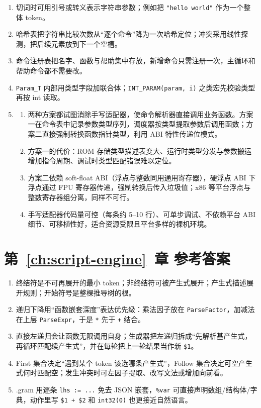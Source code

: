 \begin{enumerate}
	\item 切词时可用引号或转义表示字符串参数；例如把 \texttt{"hello world"} 作为一个整体 token。
	\item 哈希表把字符串比较次数从“逐个命令”降为一次哈希定位；冲突采用线性探测，把后续元素放到下一个空槽。
	\item 命令注册表把名字、函数与帮助集中存放，新增命令只需注册一次，主循环和帮助命令都不需要改。
	\item \texttt{Param\_T} 内部用类型字段加联合体；\texttt{INT\_PARAM(param, i)} 之类宏先校验类型再按 int 读取。
	\item
	\begin{enumerate}
		\item 两种方案都试图消除手写适配器，使命令解析器直接调用业务函数。方案一在命令表中记录参数类型序列，调度器按类型提取参数后调用函数；方案二直接强制转换函数指针类型，利用 ABI 特性传递位模式。
		\item 方案一的代价：ROM 存储类型描述表变大、运行时类型分发与参数搬运增加指令周期、调试时类型匹配错误难以定位。
		\item 方案二依赖 soft-float ABI（浮点与整数同用通用寄存器），硬浮点 ABI 下浮点通过 FPU 寄存器传递，强制转换后传入垃圾值；x86 等平台浮点与整数寄存器组分离，同样不可行。
		\item 手写适配器代码量可控（每条约 5--10 行）、可单步调试、不依赖平台 ABI 细节、可移植性好，适合资源受限且平台多样的裸机环境。
	\end{enumerate}
\end{enumerate}

\section*{第~\ref{ch:script-engine}~章 参考答案}

\begin{enumerate}
	\item 终结符是不可再展开的最小 token；非终结符可被产生式展开；产生式描述展开规则；开始符号是整棵推导树的根。
	\item 递归下降用“函数嵌套深度”表达优先级：乘法因子放在 \texttt{ParseFactor}，加减法在上层 \texttt{ParseExpr}，于是 \texttt{*} 先于 \texttt{+} 结合。
	\item 直接左递归会让函数无限调用自身；生成器把左递归拆成“先解析基产生式，再循环匹配续产生式”，并在每轮把上一轮结果当作新 \texttt{\$1}。
	\item First 集合决定“遇到某个 token 该选哪条产生式”，Follow 集合决定可空产生式何时匹配空；发生冲突时可左因子提取、改写文法或增加向前看。
	\item .gram 用逐条 \texttt{lhs := ...} 免去 JSON 嵌套，\texttt{\%var} 可直接声明数组/结构体/字典，动作里写 \texttt{\$1 + \$2} 和 \texttt{int32(0)} 也更接近自然语言。
\end{enumerate}

